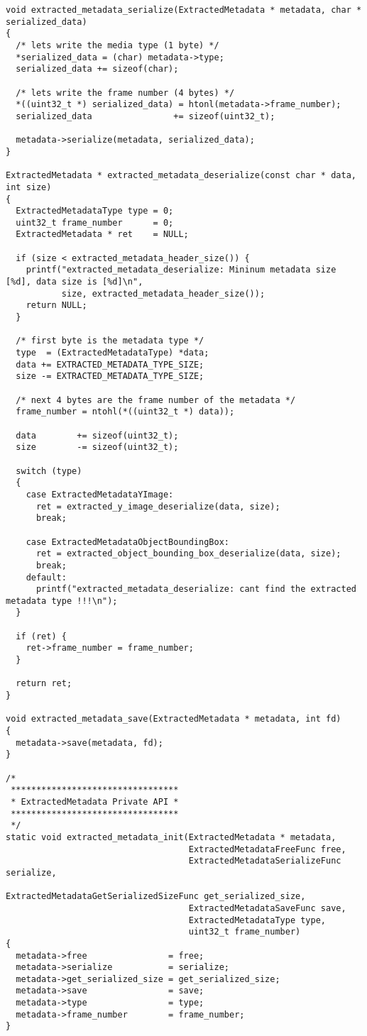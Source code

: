 \begin{lstlisting}
void extracted_metadata_serialize(ExtractedMetadata * metadata, char * serialized_data)
{
  /* lets write the media type (1 byte) */
  *serialized_data = (char) metadata->type;
  serialized_data += sizeof(char);

  /* lets write the frame number (4 bytes) */
  *((uint32_t *) serialized_data) = htonl(metadata->frame_number);
  serialized_data                += sizeof(uint32_t);

  metadata->serialize(metadata, serialized_data);
}

ExtractedMetadata * extracted_metadata_deserialize(const char * data, int size)
{
  ExtractedMetadataType type = 0;
  uint32_t frame_number      = 0;
  ExtractedMetadata * ret    = NULL;

  if (size < extracted_metadata_header_size()) {
    printf("extracted_metadata_deserialize: Mininum metadata size [%d], data size is [%d]\n", 
           size, extracted_metadata_header_size());
    return NULL;
  }

  /* first byte is the metadata type */
  type  = (ExtractedMetadataType) *data;
  data += EXTRACTED_METADATA_TYPE_SIZE;
  size -= EXTRACTED_METADATA_TYPE_SIZE;

  /* next 4 bytes are the frame number of the metadata */
  frame_number = ntohl(*((uint32_t *) data));

  data        += sizeof(uint32_t);
  size        -= sizeof(uint32_t);

  switch (type) 
  {
    case ExtractedMetadataYImage:
      ret = extracted_y_image_deserialize(data, size);
      break;

    case ExtractedMetadataObjectBoundingBox:
      ret = extracted_object_bounding_box_deserialize(data, size);
      break;
    default:
      printf("extracted_metadata_deserialize: cant find the extracted metadata type !!!\n");
  }
 
  if (ret) {
    ret->frame_number = frame_number;
  }

  return ret;
}

void extracted_metadata_save(ExtractedMetadata * metadata, int fd)
{
  metadata->save(metadata, fd);
}

/*
 *********************************
 * ExtractedMetadata Private API *
 *********************************
 */
static void extracted_metadata_init(ExtractedMetadata * metadata, 
                                    ExtractedMetadataFreeFunc free, 
                                    ExtractedMetadataSerializeFunc serialize,
                                    ExtractedMetadataGetSerializedSizeFunc get_serialized_size,
                                    ExtractedMetadataSaveFunc save,
                                    ExtractedMetadataType type,
                                    uint32_t frame_number)
{
  metadata->free                = free;
  metadata->serialize           = serialize;
  metadata->get_serialized_size = get_serialized_size;
  metadata->save                = save;
  metadata->type                = type;
  metadata->frame_number        = frame_number;
}


\end{lstlisting}
